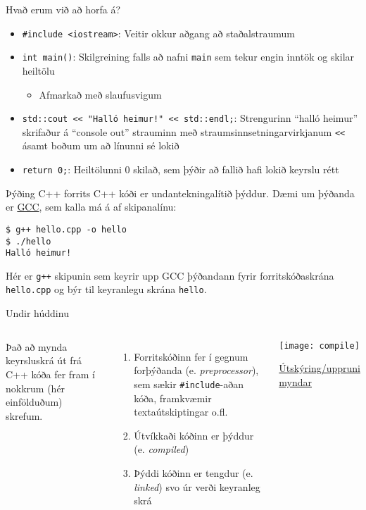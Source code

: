 \documentclass[handout]{beamer}
\begin{document}
\begin{frame}[fragile]{Hvað erum við að horfa á?}
\begin{itemize}
 \item \texttt{\#include <iostream>}: Veitir okkur aðgang að staðalstraumum
 \item \texttt{int main()}: Skilgreining falls að nafni \texttt{main} sem tekur engin inntök og skilar heiltölu
 \begin{itemize}
  \item Afmarkað með slaufusvigum
 \end{itemize}
 \item \verb|std::cout << "Halló heimur!" << std::endl;|: Strengurinn ``halló heimur'' skrifaður á ``console out'' strauminn með straumsinnsetningarvirkjanum \verb|<<| ásamt boðum um að línunni sé lokið
 \item \texttt{return 0;}: Heiltölunni 0 skilað, sem þýðir að fallið hafi lokið keyrslu rétt
\end{itemize}
\end{frame}

\begin{frame}[fragile]{Þýðing C++ forrits}
C++ kóði er undantekningalítið þýddur. Dæmi um þýðanda er \href{https://gcc.gnu.org/}{GCC}, sem kalla má á af skipanalínu:
\begin{verbatim}
$ g++ hello.cpp -o hello
$ ./hello
Halló heimur!
\end{verbatim}
Hér er \texttt{g++} skipunin sem keyrir upp GCC þýðandann fyrir forritskóðaskrána \texttt{hello.cpp} og býr til keyranlegu skrána \texttt{hello}.
\end{frame}

\begin{frame}{Undir húddinu}
\begin{columns}
Það að mynda keyrsluskrá út frá C++ kóða fer fram í nokkrum (hér einfölduðum) skrefum.
\begin{enumerate}
 \item Forritskóðinn fer í gegnum forþýðanda (e. \emph{preprocessor}), sem sækir \texttt{\#include}-aðan kóða, framkvæmir textaútskiptingar o.fl.
 \item Útvíkkaði kóðinn er þýddur (e. \emph{compiled})
 \item Þýddi kóðinn er tengdur (e. \emph{linked}) svo úr verði keyranleg skrá
\end{enumerate}
\begin{center}
\texttt{[image: compile]}

{\tiny \href{http://faculty.cs.niu.edu/~mcmahon/CS241/Notes/compile.html}{Útskýring/uppruni myndar} }
\end{center}
\end{columns}
\end{frame}
\end{document}
